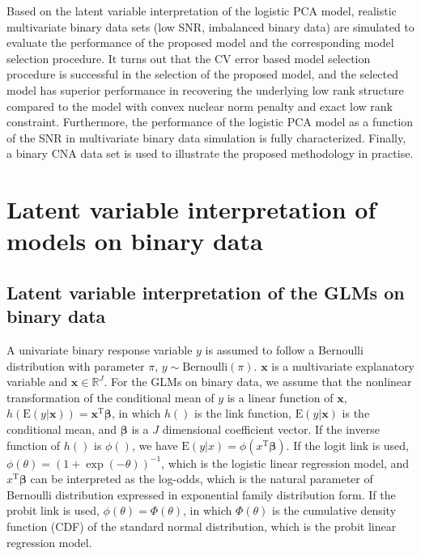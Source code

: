 Based on the latent variable interpretation of the logistic PCA model, realistic multivariate binary data sets (low SNR, imbalanced binary data) are simulated to evaluate the performance of the proposed model and the corresponding model selection procedure. It turns out that the CV error based model selection procedure is successful in the selection of the proposed model, and the selected model has superior performance in recovering the underlying low rank structure compared to the model with convex nuclear norm penalty and exact low rank constraint. Furthermore, the performance of the logistic PCA model as a function of the SNR in multivariate binary data simulation is fully characterized. Finally, a binary CNA data set is used to illustrate the proposed methodology in practise.

\section{Latent variable interpretation of models on binary data}
\subsection{Latent variable interpretation of the GLMs on binary data}
A univariate binary response variable $y$ is assumed to follow a Bernoulli distribution with parameter $\pi$, $y \sim \text{Bernoulli}(\pi)$. $\mathbf{x}$ is a multivariate explanatory variable and $\mathbf{x} \in \mathbb{R}^J$. For the GLMs on binary data, we assume that the nonlinear transformation of the conditional mean of $y$ is a linear function of $\mathbf{x}$, $h(\text{E}(y|\mathbf{x})) = \mathbf{x}^{\text{T}} \bm{\beta}$, in which $h()$ is the link function, $\text{E}(y|\mathbf{x})$ is the conditional mean, and $\bm{\beta}$ is a $J$ dimensional coefficient vector. If the inverse function of $h()$ is $\phi()$, we have $\text{E}(y|x) = \phi(x^{\text{T}}\bm{\beta})$. If the logit link is used, $\phi(\theta) = (1+\exp(-\theta))^{-1}$, which is the logistic linear regression model, and $x^{\text{T}}\bm{\beta}$ can be interpreted as the log-odds, which is the natural parameter of Bernoulli distribution expressed in exponential family distribution form. If the probit link is used, $\phi(\theta) = \Phi(\theta)$, in which $\Phi(\theta)$ is the cumulative density function (CDF) of the standard normal distribution, which is the probit linear regression model.

